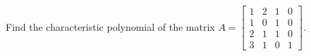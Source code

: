 Find the characteristic polynomial of the matrix 
$A = \begin{bmatrix} 
1 & 2 & 1 & 0\\
1 & 0 & 1 & 0\\
2 & 1 & 1 & 0\\ 
3 & 1 & 0 & 1 
\end{bmatrix}$.